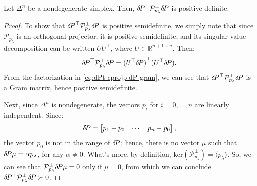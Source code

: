 \documentclass[eikonal.tex]{subfiles}
\begin{document}


\begin{lemma}\label{lemma:dPt-cprojp-dP-pd}
  Let $\Delta^n$ be a nondegenerate simplex. Then,
  ${\delta \hspace{-0.14em} P}^\top \mathcal{P}^\perp_{p_\lambda} {\delta \hspace{-0.14em} P}$ is positive
  definite.
\end{lemma}

\begin{proof}
  To show that ${\delta \hspace{-0.14em} P}^\top \mathcal{P}^\perp_{p_\lambda} {\delta \hspace{-0.14em} P}$
  is positive semidefinite, we simply note that since
  $\mathcal{P}^\perp_{p_\lambda}$ is an orthogonal projector, it is
  positive semidefinite, and its singular value decomposition can be
  written $UU^\top$, where $U \in \mathbb{R}^{n+1 \times n}$. Then:
  \begin{equation}\label{eq:dPt-cprojp-dP-gram}
    {\delta \hspace{-0.14em} P}^\top \mathcal{P}^\perp_{p_\lambda} {\delta \hspace{-0.14em} P} = {(U^\top {\delta \hspace{-0.14em} P})}^\top {(U^\top {\delta \hspace{-0.14em} P})}.
  \end{equation}
  From the factorization in \cref{eq:dPt-cprojp-dP-gram}, we can see
  that ${\delta \hspace{-0.14em} P}^\top \mathcal{P}^\perp_{p_\lambda} {\delta \hspace{-0.14em} P}$ is a
  Gram matrix, hence positive semidefinite.

  Next, since $\Delta^n$ is nondegenerate, the vectors $p_i$ for
  $i = 0, \hdots, n$ are linearly independent. Since:
  \begin{equation*}
    {\delta \hspace{-0.14em} P} = \begin{bmatrix} p_1 - p_0 & \cdots & p_n - p_0 \end{bmatrix},
  \end{equation*}
  the vector $p_0$ is not in the range of ${\delta \hspace{-0.14em} P}$; hence, there is
  no vector $\mu$ such that ${\delta \hspace{-0.14em} P} \mu = \alpha p_\lambda$, for any
  $\alpha \neq 0$. What's more, by definition,
  $\text{ker}(\mathcal{P}_{p_\lambda}^\perp) = \langle p_\lambda
  \rangle$. So, we can see that
  $\mathcal{P}^\perp_{p_\lambda} {\delta \hspace{-0.14em} P} \mu = 0$ only if $\mu = 0$,
  from which we can conclude
  ${\delta \hspace{-0.14em} P}^\top \mathcal{P}^\perp_{p_\lambda} {\delta \hspace{-0.14em} P} \succ 0$.
\end{proof}
\end{document}
